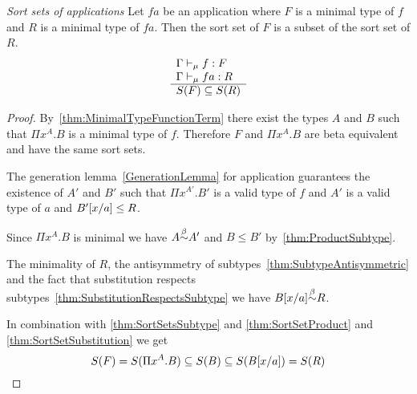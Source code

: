 \begin{theorem}
    \label{thm:SortSetApplication}
    \emph{Sort sets of applications} Let $fa$ be an application where $F$ is a
    minimal type of $f$ and $R$ is a minimal type of $fa$. Then the sort set of
    $F$ is a subset of the sort set of $R$.
    $$
    \rulev{
        \Gamma \vdashmin f : F
        \\
        \Gamma \vdashmin fa : R
    }
    {
        S(F) \subseteq S(R)
    }
    $$
    \begin{proof}

        By~\ref{thm:MinimalTypeFunctionTerm} there exist the types $A$ and $B$
        such that $\Pi x^A. B$ is a minimal type of $f$. Therefore $F$ and $\Pi
        x^A.B$ are beta equivalent and have the same sort sets.

        The generation lemma~\ref{GenerationLemma} for application guarantees
        the existence of $A'$ and $B'$ such that $\Pi x^{A'}.B'$ is a valid type
        of $f$ and $A'$ is a valid type of $a$ and $\sub a x {B'} \le R$.

        Since $\Pi x^A. B$ is minimal we have $A \betaeq A'$ and $B \le B'$
        by~\ref{thm:ProductSubtype}.

        The minimality of $R$, the antisymmetry of
        subtypes~\ref{thm:SubtypeAntisymmetric} and the fact that
        substitution respects subtypes~\ref{thm:SubstitutionRespectsSubtype} we
        have $\sub a x B \betaeq R$.

        In combination with \ref{thm:SortSetsSubtype} and
        \ref{thm:SortSetProduct} and \ref{thm:SortSetSubstitution} we get
        $$
        S(F) = S(\Pi x^A. B)
            \subseteq S(B)
            \subseteq S(\sub a x B)
            = S(R)
        $$
    \end{proof}
\end{theorem}






